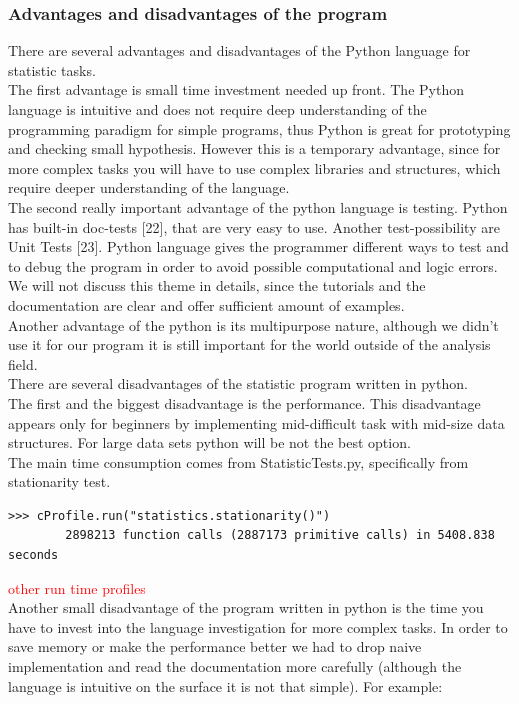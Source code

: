 \documentclass{article}
\begin{document}
\subsubsection{Advantages and disadvantages of the program}
There are several advantages and disadvantages of the Python language for statistic tasks.\\
The first advantage is small time investment needed up front. The Python language is intuitive and does not require deep understanding of the programming paradigm for simple programs, thus Python is great for prototyping and checking small hypothesis. However this is a temporary advantage, since for more complex tasks you will have to use complex libraries and structures, which require deeper understanding of the language.\\
The second really important advantage of the python language is testing. Python has built-in doc-tests [22], that are very easy to use. Another test-possibility are Unit Tests [23]. Python language gives the programmer different ways to test and to debug the program in order to avoid possible computational and logic errors. We will not discuss this theme in details, since the tutorials and the documentation are clear and offer sufficient amount of examples.\\
Another advantage of the python is its multipurpose nature, although we didn't use it for our program it is still important for the world outside of the analysis field.\\
There are several disadvantages of the statistic program written in python.\\ 
The first and the biggest disadvantage is the performance. This disadvantage appears only for beginners by implementing mid-difficult task with mid-size data structures. For large data sets python will be not the best option.\\
The main time consumption comes from StatisticTests.py, specifically from stationarity test. 
\begin{verbatim}
>>> cProfile.run("statistics.stationarity()")
        2898213 function calls (2887173 primitive calls) in 5408.838 seconds
\end{verbatim}
\textcolor{red}{other run time profiles}\\
Another small disadvantage of the program written in python is the time you have to invest into the language investigation for more complex tasks. In order to save memory or make the performance better we had to drop naive implementation and read the documentation more carefully (although the language is intuitive on the surface it is not that simple). For example:
\end{document}
